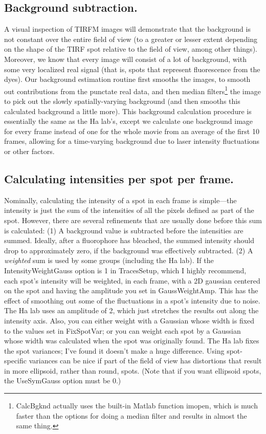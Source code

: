 \documentclass[11pt]{article}
\begin{document}
\subsection{Background subtraction.}\label{sec:CalcBkgndExplain}

A visual inspection of TIRFM images will demonstrate that the background is not constant over the entire field of view (to a greater or lesser extent depending on the shape of the TIRF spot relative to the field of view, among other things).  Moreover, we know that every image will consist of a lot of background, with some very localized real signal (that is, spots that represent fluorescence from the dyes).  Our background estimation routine first smooths the images, to smooth out contributions from the punctate real data, and then median filters\footnote{CalcBgknd actually uses the built-in Matlab function imopen, which is much faster than the options for doing a median filter and results in almost the same thing.} the image to pick out the slowly spatially-varying background (and then smooths this calculated background a little more).  This background calculation procedure is essentially the same as the Ha lab's, except we calculate one background image for every frame instead of one for the whole movie from an average of the first 10 frames, allowing for a time-varying background due to laser intensity fluctuations or other factors.

\subsection{Calculating intensities per spot per frame.}\label{sec:CalcI}

Nominally, calculating the intensity of a spot in each frame is simple---the intensity is just the sum of the intensities of all the pixels defined as part of the spot. However, there are several refinements that are usually done before this sum is calculated: (1) A background value is subtracted before the intensities are summed.  Ideally, after a fluorophore has bleached, the summed intensity should drop to approximately zero, if the background was effectively subtracted. (2) A {\it weighted} sum is used by some groups (including the Ha lab). If the IntensityWeightGauss option is 1 in TracesSetup, which I highly recommend, each spot's intensity will be weighted, in each frame, with a 2D gaussian centered on the spot and having the amplitude you set in GaussWeightAmp. This has the effect of smoothing out some of the fluctuations in a spot's intensity due to noise. The Ha lab uses an amplitude of 2, which just stretches the results out along the intensity axis.  Also, you can either weight with a Gaussian whose width is fixed to the values set in FixSpotVar; or you can weight each spot by a Gaussian whose width was calculated when the spot was originally found. The Ha lab fixes the spot variances; I've found it doesn't make a huge difference. Using spot-specific variances can be nice if part of the field of view has distortions that result in more ellipsoid, rather than round, spots.  (Note that if you want ellipsoid spots, the UseSymGauss option must be 0.)
\end{document}
